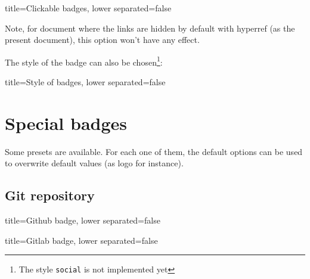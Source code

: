 \begin{tcblisting}{title={Clickable badges}, lower separated=false}
\end{tcblisting}

Note, for document where the links are hidden by default with \textsf{hyperref} (as the present document), this option won't have any effect.

\vspace{\baselineskip}

The style of the badge can also be chosen\footnote{The style \texttt{social} is not implemented yet}:

\begin{tcblisting}{title={Style of badges}, lower separated=false}
\end{tcblisting}




\section{Special badges}
\label{sec:special-badges}


Some presets are available.
For each one of them, the default options can be used to overwrite default values (as logo for instance).

\subsection{Git repository}

\begin{tcblisting}{title={Github badge}, lower separated=false}
\end{tcblisting}

\begin{tcblisting}{title={Gitlab badge}, lower separated=false}
\end{tcblisting}

